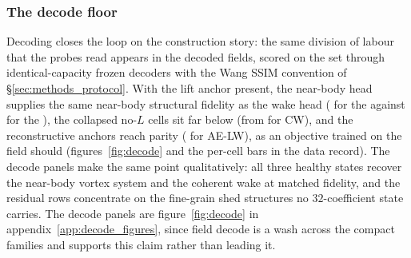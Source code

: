 
\subsubsection{The decode floor}
\label{sec:res_reconstruction}

Decoding closes the loop on the construction story: the same division of
labour that the probes read appears in the decoded fields, scored on
the \TestSplit{} set through identical-capacity frozen decoders with the Wang SSIM
convention of \S\ref{sec:methods_protocol}. With the lift anchor present,
the near-body head supplies the same near-body structural fidelity as the wake
head (\TcSsimNbCLN{} for the \LiftState{} against \TcSsimNbCLW{} for the
\PredState), the
collapsed no-$L$ cells sit far below (from \TcSsimNbCW{} for CW), and the
reconstructive anchors reach parity (\TcSsimNbAeLW{} for AE-LW), as an
objective trained on the field should
(figures~\ref{fig:decode} and the per-cell bars in the data record). The
decode panels make the same point qualitatively: all three healthy states
recover the near-body vortex system and the coherent wake at matched
fidelity, and the residual rows concentrate on the fine-grain shed
structures no $32$-coefficient state carries. The decode panels are
figure~\ref{fig:decode} in appendix~\ref{app:decode_figures}, since field decode
is a wash across the compact families and supports this claim rather than leading
it.\re
